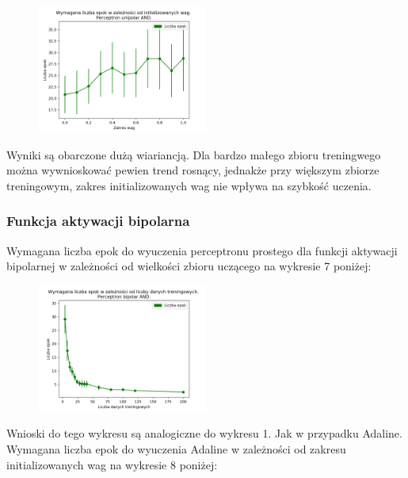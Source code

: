 \documentclass{article}
\begin{document}
	\begin{figure}[h]
		\centering
		\caption{}
		\includegraphics[width=0.5\textwidth]{epoki_wagi_perceptron_unipolar.png}
	\end{figure}
	
	Wyniki są obarczone dużą wiariancją. Dla bardzo małego zbioru treningwego można wywnioskować pewien trend rosnący, jednakże przy większym zbiorze treningowym, zakres initializowanych wag nie wpływa na szybkość uczenia.
	\newpage
	\subsubsection{Funkcja aktywacji bipolarna}
	Wymagana liczba epok do wyuczenia perceptronu prostego dla funkcji aktywacji bipolarnej w zależności od wielkości zbioru uczącego na wykresie 7 poniżej:
	\begin{figure}[h]
		\centering
		\caption{}
		\includegraphics[width=0.5\textwidth]{epoki_date_perceptron_bipolar.png}
	\end{figure}

Wnioski do tego wykresu są analogiczne do wykresu 1. Jak w przypadku Adaline.\\[0.5cm]

	Wymagana liczba epok do wyuczenia Adaline w zależności od zakresu initializowanych wag na wykresie 8 poniżej:
	
\end{document}
